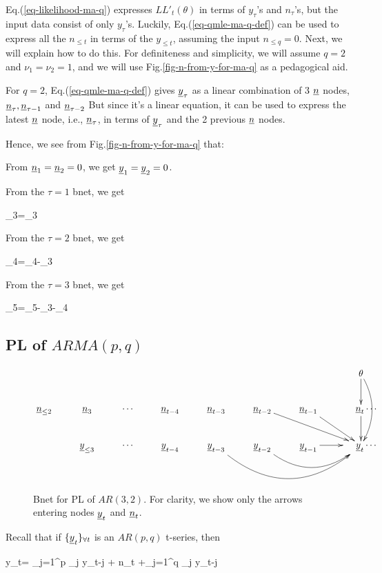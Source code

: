 Eq.(\ref{eq-likelihood-ma-q})
expresses $ LL'_t(\theta)$
in terms of $y_\tau$'s and $n_\tau$'s,
but the input data
consist of only $y_\tau$'s.
Luckily,
Eq.(\ref{eq-qmle-ma-q-def})
can be used to express
all the $n_{\leq t}$
in terms of the
$y_{\leq t}$,
assuming the input $n_{\leq q}=0$.
Next, we will
explain how to do this.
For definiteness and simplicity,
we  will assume $q=2$ and
$\nu_1=\nu_2=1$, and we will
use
 Fig.\ref{fig-n-from-y-for-ma-q}
as a pedagogical aid.

For $q=2$,
Eq.(\ref{eq-qmle-ma-q-def})
gives $\rvy_\tau$ as a linear
combination of 3 $\rvn$ nodes,
 $\rvn_\tau,\rvn_{\tau-1}$ and $\rvn_{\tau-2}$
But since it's a linear equation,
it can be used to
express the latest $\rvn$ node,
i.e., $\rvn_{\tau}$,
in terms of $\rvy_{\tau}$
and the 2 previous $\rvn$
nodes.

Hence,
we see from Fig.\ref{fig-n-from-y-for-ma-q}
that:

From $\rvn_1=\rvn_2=0$,
we get $\rvy_1=\rvy_2=0$.

From the $\tau=1$ bnet, we get

\beq
\rvn_3=\rvy_3
\eeq

From the $\tau=2$ bnet, we get

\beq
\rvn_4=\rvy_4-\rvn_3
\eeq

From the $\tau=3$ bnet, we get

\beq
\rvn_5=\rvy_5-\rvn_3-\rvn_4
\eeq

\subsection{\;\;\;PL of $ARMA(p,q)$}


\begin{figure}[h!]
$$
\xymatrix{
&&&&&&&\theta\ar[d]\ar@/^1pc/[dd]
\\
\rvn_{\leq 2}
&\rvn_{3}
&\cdots
&\rvn_{t-4}
&\rvn_{t-3}
&\rvn_{t-2}\ar[drr]
&\rvn_{t-1}\ar[dr]
&\;\;\;\;\rvn_{t}\ar[d]
\cdots
\\
\;
&\rvy_{\leq 3}
&\cdots
&\rvy_{t-4}
&\rvy_{t-3}\ar@/_3pc/[rrr]
&\rvy_{t-2}\ar@/_2pc/[rr]
&\rvy_{t-1}\ar[r]
&\;\;\;\;\rvy_{t}
\cdots
\\
\;
}
$$
\caption{Bnet for PL of
$AR(3, 2)$.
For clarity,
we show only the
arrows entering nodes $\rvy_t$
and $\rvn_t$.}
\label{fig-qmle-arma-3-2}
\end{figure}

Recall that
if $\tseries{\rvy_t}$ is an
$AR(p,q)$ t-series, then

\beq
y_t=
\sum_{j=1}^p
\alp_j y_{t-j} + n_t
+\sum_{j=1}^q \nu_j y_{t-j}
\label{eq-qmle-arma-p-q-def}
\eeq

